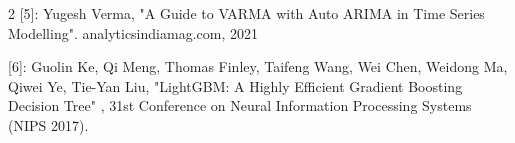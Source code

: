 \documentclass{article}
\begin{document}
\begin{multicols}{2}
[5]: Yugesh Verma, "A Guide to VARMA with Auto ARIMA in Time Series Modelling". analyticsindiamag.com, 2021 

[6]: Guolin Ke, Qi Meng, Thomas Finley, Taifeng Wang, Wei Chen, Weidong Ma, Qiwei Ye, Tie-Yan Liu, "LightGBM: A Highly Efficient Gradient Boosting
Decision Tree" , 31st Conference on Neural Information Processing Systems (NIPS 2017).


\end{multicols}
\end{document}
